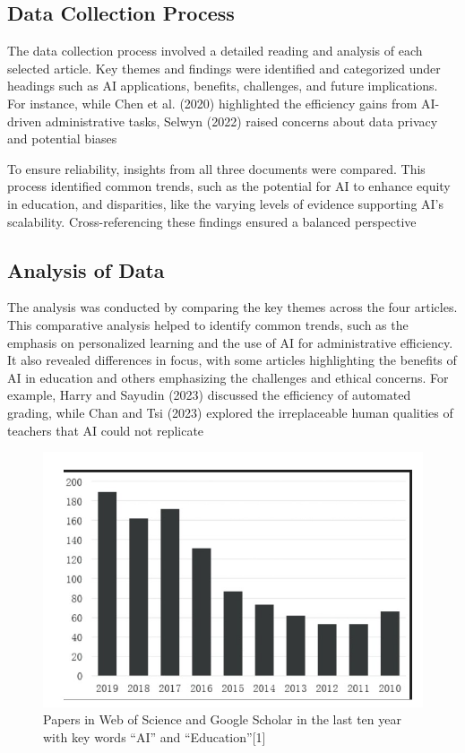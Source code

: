 \documentclass[conference]{IEEEtran}
\begin{document}
\subsection{Data Collection Process}
The data collection process involved a detailed reading and analysis of each selected article. Key themes and findings were identified and categorized under headings such as AI applications, benefits, challenges, and future implications. For instance, while Chen et al. (2020) highlighted the efficiency gains from AI-driven administrative tasks, Selwyn (2022) raised concerns about data privacy and potential biases \cite{r1} \cite{r4}

To ensure reliability, insights from all three documents were compared. This process identified common trends, such as the potential for AI to enhance equity in education, and disparities, like the varying levels of evidence supporting AI’s scalability. Cross-referencing these findings ensured a balanced perspective

\subsection{Analysis of Data}

The analysis was conducted by comparing the key themes across the four articles. This comparative analysis helped to identify common trends, such as the emphasis on personalized learning and the use of AI for administrative efficiency. It also revealed differences in focus, with some articles highlighting the benefits of AI in education and others emphasizing the challenges and ethical concerns. For example, Harry and Sayudin (2023) discussed the efficiency of automated grading, while Chan and Tsi (2023) explored the irreplaceable human qualities of teachers that AI could not replicate

\begin{figure} [h]
    \centering
    \includegraphics[width=\linewidth]{picture_2.jpg}
    \caption{Papers in Web of Science and Google Scholar in the last ten year with key words “AI” and “Education”[1]}
    \label{fig:enter-label}
\end{figure}
\end{document}
